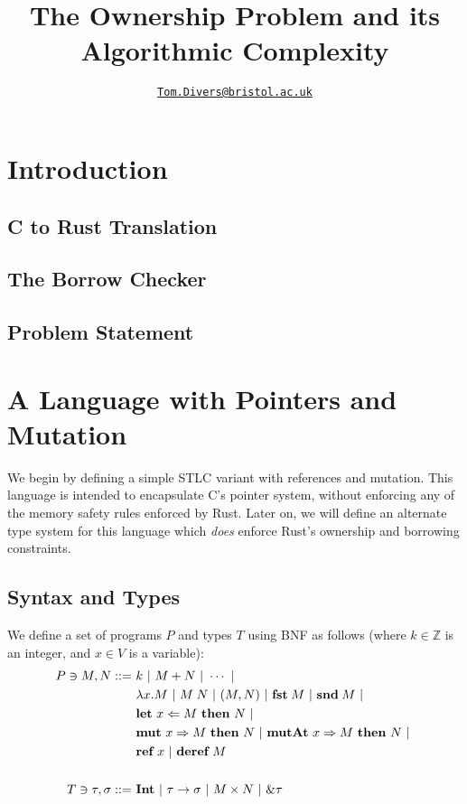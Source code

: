 \documentclass{article}
\title{The Ownership Problem and its Algorithmic Complexity}
\author{\href{mailto:oi24939@bristol.ac.uk}{\texttt{Tom.Divers@bristol.ac.uk}}}
\date{}
\newcommand{\agap}{\hspace{0.25em}}
\newcommand{\mkref}{\textbf{ref}~}
\newcommand{\deref}{\textbf{deref}~}%
\newcommand{\mutate}[3]{\textbf{mut}~ #1 \Rightarrow #2 ~\textbf{then}~ #3}
\newcommand{\mutptr}[3]{\textbf{mutAt}~ #1 \Rightarrow #2 ~\textbf{then}~ #3}
\newcommand{\letvar}[3]{\textbf{let}~ #1 \Leftarrow #2 ~\textbf{then}~ #3}
\begin{document}
\maketitle

\section{Introduction}

\subsection{C to Rust Translation}

\cite{zhang2023crown}

\subsection{The Borrow Checker}

\subsection{Problem Statement}

\section{A Language with Pointers and Mutation}

We begin by defining a simple STLC variant with references and mutation. This language is intended to encapsulate C's pointer system, without enforcing any of the memory safety rules enforced by Rust. Later on, we will define an alternate type system for this language which \textit{does} enforce Rust's ownership and borrowing constraints.


\subsection{Syntax and Types}

We define a set of programs $P$ and types $T$ using BNF as follows (where $k \in \mathbb{Z}$ is an integer, and $x \in V$ is a variable):
\begin{align*}
    P \ni M, N ::=~ &k ~|~ M + N ~|~ \cdots ~|~\\ 
    &\lambda x . M ~|~ M \agap N ~|~ (M, N) ~|~ \textbf{fst}\agap M ~|~ \textbf{snd}\agap M ~|~\\
    &\letvar{x}{M}{N} ~|~\\ 
    &\mutate{x}{M}{N} ~|~ \mutptr{x}{M}{N} ~|~\\
    &\mkref x ~|~ \deref M\\    
    ~\\
    T \ni \tau, \sigma ::=~ &\textbf{Int} ~|~ \tau \rightarrow \sigma ~|~ M \times N ~|~ \& \tau
\end{align*}
\end{document}
